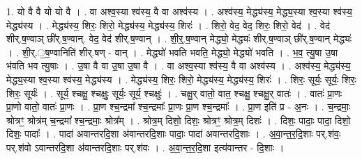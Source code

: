 \documentclass[17pt]{extarticle}
\begin{document}
1. यो वै वै यो यो वै । . वा अश्व॒स्या श्व॑स्य॒ वै वा अश्व॑स्य । . अश्व॑स्य॒ मेद्ध्य॑स्य॒ मेद्ध्य॒स्या श्व॒स्या श्व॑स्य॒ मेद्ध्य॑स्य । . मेद्ध्य॑स्य॒ शिरः॒ शिरो॒ मेद्ध्य॑स्य॒ मेद्ध्य॑स्य॒ शिरः॑ । . शिरो॒ वेद॒ वेद॒ शिरः॒ शिरो॒ वेद॑ । . वेद॑ शीर्.ष॒ण्वाञ् छी॑र्.ष॒ण्वान्. वेद॒ वेद॑ शीर्.ष॒ण्वान् । . शी॒र्॒.ष॒ण्वान् मेद्ध्यो॒ मेद्ध्यः॑ शीर्.ष॒ण्वाञ् छी॑र्.ष॒ण्वान् मेद्ध्यः॑ । . शी॒र्.॒ष॒ण्वानिति॑ शीर्.षण् - वान् । . मेद्ध्यो॑ भवति भवति॒ मेद्ध्यो॒ मेद्ध्यो॑ भवति । . भ॒व॒ त्यु॒षा उ॒षा भ॑वति भव त्यु॒षाः । . उ॒षा वै वा उ॒षा उ॒षा वै । . वा अश्व॒स्या श्व॑स्य॒ वै वा अश्व॑स्य । . अश्व॑स्य॒ मेद्ध्य॑स्य॒ मेद्ध्य॒स्या श्व॒स्या श्व॑स्य॒ मेद्ध्य॑स्य । . मेद्ध्य॑स्य॒ शिरः॒ शिरो॒ मेद्ध्य॑स्य॒ मेद्ध्य॑स्य॒ शिरः॑ । . शिरः॒ सूर्यः॒ सूर्यः॒ शिरः॒ शिरः॒ सूर्यः॑ । . सूर्य॒ श्चक्षु॒ श्चक्षुः॒ सूर्यः॒ सूर्य॒ श्चक्षुः॑ । . चक्षु॒र् वातो॒ वात॒ श्चक्षु॒ श्चक्षु॒र् वातः॑ । . वातः॑ प्रा॒णः प्रा॒णो वातो॒ वातः॑ प्रा॒णः । . प्रा॒ण श्च॒न्द्रमा᳚ श्च॒न्द्रमाः᳚ प्रा॒णः प्रा॒ण श्च॒न्द्रमाः᳚ । . प्रा॒ण इति॑ प्र - अ॒नः । . च॒न्द्रमाः॒ श्रोत्रꣳ॒॒ श्रोत्र॑म् च॒न्द्रमा᳚ श्च॒न्द्रमाः॒ श्रोत्र᳚म् । . श्रोत्र॒म् दिशो॒ दिशः॒ श्रोत्रꣳ॒॒ श्रोत्र॒म् दिशः॑ । . दिशः॒ पादाः॒ पादा॒ दिशो॒ दिशः॒ पादाः᳚ । . पादा॑ अवान्तरदि॒शा अ॑वान्तरदि॒शाः पादाः॒ पादा॑ अवान्तरदि॒शाः । . अ॒वा॒न्त॒र॒दि॒शाः पर्.श॑वः॒ पर्.श॑वो ऽवान्तरदि॒शा अ॑वान्तरदि॒शाः पर्.श॑वः । . अ॒वा॒न्त॒र॒दि॒शा इत्य॑वान्तर - दि॒शाः । \newline
\end{document}
